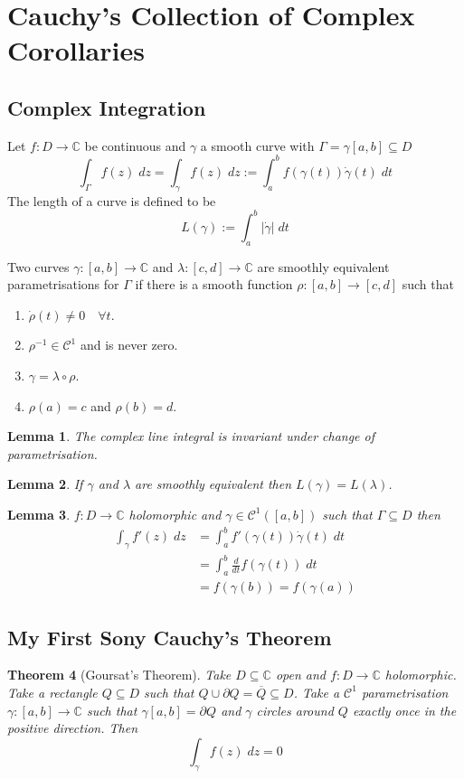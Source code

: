 \documentclass[11pt]{article}
\newcommand{\defeq}{:=}
\newcommand{\abs}[1]{|#1|}
\newcommand{\C}{\mathbb{C}}
\newenvironment{defin}
	{\begin{mdframed}[backgroundcolor=white, roundcorner=5pt, linewidth=1pt]}
	{\end{mdframed}}
\newcommand{\mdf}[1]{{\color{red} #1}}
\newtheorem{theorem}{Theorem}[section]
\newtheorem{lemma}[theorem]{Lemma}
\begin{document}
\section{Cauchy's Collection of Complex Corollaries}

\subsection{Complex Integration}
\begin{defin}
	Let $f:D\to\C$ be continuous and $\gamma$ a smooth curve with $\Gamma=\gamma[a,b]\subseteq D$
	\[
		\int_\Gamma f(z)\;dz=\int_\gamma f(z)\;dz \defeq \int_a^bf(\gamma(t))\dot{\gamma}(t)\; dt
	\]
	The length of a curve is defined to be
	\[
		L(\gamma)\defeq\int_a^b\abs{\dot{\gamma}}\; dt
	\]

	Two curves $\gamma:[a,b]\to\C$ and $\lambda:[c, d]\to\C$ are \mdf{smoothly equivalent parametrisations} for $\Gamma$ if there is a smooth  function $\rho:[a,b]\to[c, d]$ such that
	\begin{enumerate}[label=(\roman*)]
		\item $\dot{\rho}(t)\neq0 \quad \forall t$.
		\item $\rho^{-1}\in\mathcal{C}^1$ and is never zero.
		\item $\gamma = \lambda \circ \rho$.
		\item $\rho(a)=c$ and $\rho(b)=d$.
	\end{enumerate}
\end{defin}
\begin{lemma}
The complex line integral is invariant under change of parametrisation.
\end{lemma}
\begin{lemma}
If $\gamma$ and $\lambda$ are smoothly equivalent then $L(\gamma)=L(\lambda)$.
\end{lemma}

\begin{lemma}
$f:D\to \C$ holomorphic and $\gamma\in\mathcal{C}^1([a, b])$ such that $\Gamma\subseteq D$ then
\begin{align*}
	\int_\gamma f'(z)\;dz &=\int_a^b f'(\gamma(t))\dot{\gamma}(t)\;dt	\\
						  &=\int_a^b \frac{d}{dt}f(\gamma(t))\;dt \\
						  &=f(\gamma(b)) = f(\gamma(a))
\end{align*}
\end{lemma}

\subsection{My First Sony Cauchy's Theorem}
\begin{theorem}[Goursat's Theorem]
Take $D\subseteq \C$ open and $f:D\to\C$ holomorphic.
Take a rectangle $Q\subseteq D$ such that $Q\cup \partial Q = \overline{Q}\subseteq D$.
Take a $\mathcal{C}^1$ parametrisation $\gamma:[a, b]\to\C$ such that $\gamma[a, b]=\partial Q$ and $\gamma$ circles around $Q$ exactly once in the positive direction.
Then
\[
	\int_\gamma f(z)\; dz =0
\]
\end{theorem}
\end{document}
